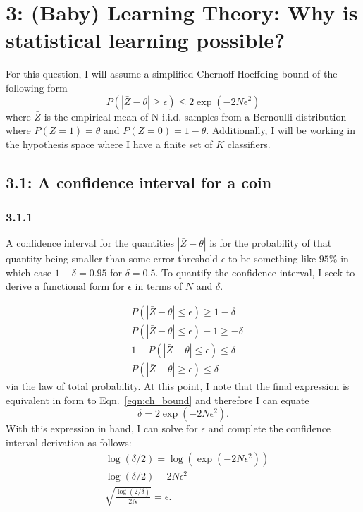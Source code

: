 \documentclass[12pt]{amsart}
\begin{document}
\section*{3: (Baby) Learning Theory: Why is statistical learning possible?}

For this question, I will assume a simplified Chernoff-Hoeffding bound of the following form
\begin{equation} \label{eqn:ch_bound}
P(|\bar{Z} - \theta| \geq \epsilon) \leq 2 \exp(-2N \epsilon^2)
\end{equation}
where $\bar{Z}$ is the empirical mean of N i.i.d. samples from a Bernoulli distribution where $P(Z = 1) = \theta$ and $P(Z = 0) = 1 - \theta$.  Additionally, I will be working in the hypothesis space where I have a finite set of $K$ classifiers.

\subsection*{3.1: A confidence interval for a coin}

\subsubsection*{3.1.1}

A confidence interval for the quantities $|\bar{Z} - \theta|$ is for the probability of that quantity being smaller than some error threshold $\epsilon$ to be something like $95\%$ in which case $1 - \delta = 0.95$ for $\delta = 0.5$.  To quantify the confidence interval, I seek to derive a functional form for $\epsilon$ in terms of $N$ and $\delta$.

\begin{equation}
\begin{split}
& P(|\bar{Z} - \theta| \leq \epsilon) \geq 1 - \delta \\
& P(|\bar{Z} - \theta| \leq \epsilon) - 1 \geq - \delta \\
& 1- P(|\bar{Z} - \theta| \leq \epsilon) \leq \delta \\
& P(|\bar{Z} - \theta| \geq \epsilon) \leq \delta
\end{split}
\end{equation}
via the law of total probability.  At this point, I note that the final expression is equivalent in form to Eqn.~\ref{eqn:ch_bound} and therefore I can equate
\begin{equation}
\delta = 2 \exp(-2N \epsilon^2).
\end{equation}
With this expression in hand, I can solve for $\epsilon$ and complete the confidence interval derivation as follows:
\begin{equation} \label{eqn:eps_bound}
\begin{split}
& \log (\delta/2) = \log(\exp(-2N \epsilon^2)) \\
& \log(\delta/2) -2N \epsilon^2 \\
& \sqrt{\frac{\log(2/\delta)}{2N}} = \epsilon .
\end{split}
\end{equation}
\end{document}
